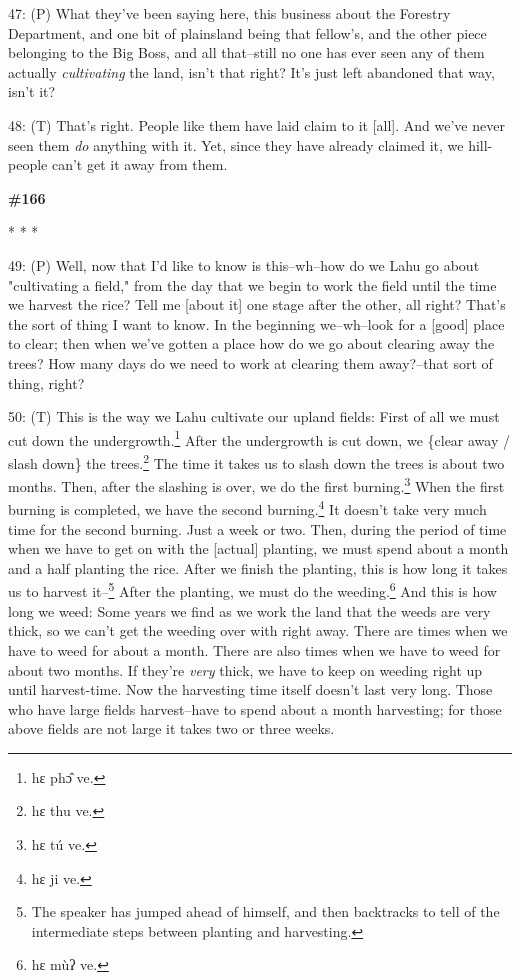 47: (P) What they've been saying here, this business about the Forestry Department,
and one bit of plainsland being that fellow's, and the other piece belonging to
the Big Boss, and all that--still no one has ever seen any of them actually \textit{cultivating}
the land, isn't that right? It's just left abandoned that way, isn't it?

48: (T) That's right. People like them have laid claim to it [all]. And we've never
seen them \textit{do }anything with it. Yet, since they have already claimed it,
we hill-people can't get it away from them.

\begin{center}
\textbf{\#166 }

* * *
\end{center}

\leftskip=0pt
49: (P) Well, now that I'd like to know is this--wh--how do we Lahu go about "cultivating
a field," from the day that we begin to work the field until the time
we harvest the rice? Tell me [about it] one stage after the other, all right? That's
the sort of thing I want to know. In the beginning we--wh--look for a [good] place
to clear; then when we've gotten a place how do we go about clearing away the trees?
How many days do we need to work at clearing them away?--that sort of thing, right?

50: (T) This is the way we Lahu cultivate our upland fields: First of all we must
cut down the undergrowth.\footnote{hɛ phɔ̂ ve.} After the undergrowth is cut down, we \{clear away
/ slash down\} the trees.\footnote{hɛ thu ve.} The time it takes us to slash down the trees is about
two months. Then, after the slashing is over, we do the first burning.\footnote{hɛ tú ve.} When
the first burning is completed, we have the second burning.\footnote{hɛ ji ve.} It doesn't take
very much time for the second burning. Just a week or two. Then, during the period
of time when we have to get on with the [actual] planting, we must spend about
a month and a half planting the rice. After we finish the planting, this is how
long it takes us to harvest it--\footnote{The speaker has jumped ahead of himself, and then backtracks to tell of the intermediate steps between planting and harvesting.} After the planting, we must do the weeding.\footnote{hɛ mùʔ ve.}
And this is how long we weed: Some years we find as we work the land that the weeds
are very thick, so we can't get the weeding over with right away. There are times
when we have to weed for about a month. There are also times when we have to weed
for about two months. If they're \textit{very} thick, we have to keep on weeding
right up until harvest-time. Now the harvesting time itself doesn't last very long.
Those who have large fields harvest--have to spend about a month harvesting; for
those above fields are not large it takes two or three weeks.

